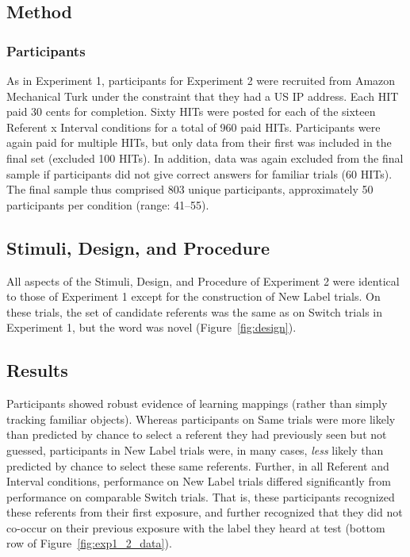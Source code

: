 \documentclass[man,floatsintext]{apa6}
\begin{document}
\subsection{Method}

\subsubsection{Participants}

As in Experiment 1, participants for Experiment 2 were recruited from Amazon Mechanical Turk under the constraint that they had a US IP address. Each HIT paid 30 cents for completion. Sixty HITs were posted for each of the sixteen Referent x Interval conditions for a total of 960 paid HITs. Participants were again paid for multiple HITs, but only data from their first was included in the final set (excluded 100 HITs). In addition, data was again excluded from the final sample if participants did not give correct answers for familiar trials (60 HITs). The final sample thus comprised 803 unique participants, approximately 50 participants per condition (range: 41--55).

\subsection{Stimuli, Design, and Procedure}

All aspects of the Stimuli, Design, and Procedure of Experiment 2 were identical to those of Experiment 1 except for the construction of New Label trials. On these trials, the set of candidate referents was the same as on Switch trials in Experiment 1, but the word was novel (Figure~\ref{fig:design}).

\subsection{Results}

Participants showed robust evidence of learning mappings (rather than simply tracking familiar objects). Whereas participants on Same trials were more likely than predicted by chance to select a referent they had previously seen but not guessed, participants in New Label trials were, in many cases, \emph{less} likely than predicted by chance to select these same referents. Further, in all Referent and Interval conditions, performance on New Label trials differed significantly from performance on comparable Switch trials. That is, these participants recognized these referents from their first exposure, and further recognized that they did not co-occur on their previous exposure with the label they heard at test (bottom row of Figure~\ref{fig:exp1_2_data}).
\end{document}
